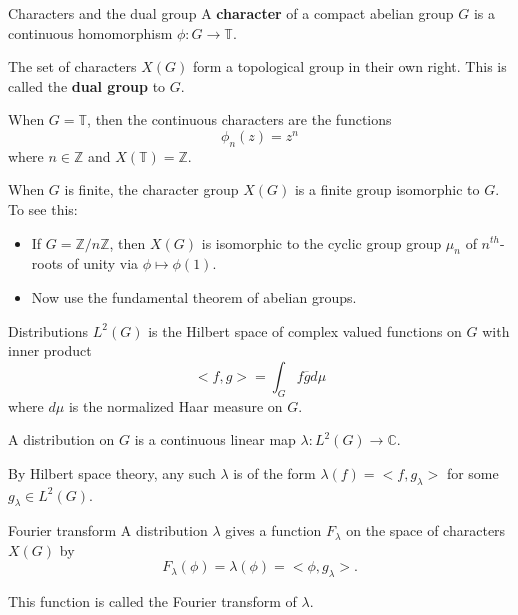 \documentclass[
  ignorenonframetext,
]{beamer}
\providecommand{\tightlist}{%
  \setlength{\itemsep}{0pt}\setlength{\parskip}{0pt}}
\begin{document}
\begin{frame}{Characters and the dual group}
\protect\hypertarget{characters-and-the-dual-group}{}
A \textbf{character} of a compact abelian group \(G\) is a continuous
homomorphism \(\phi:G\to \mathbb{T}\).

The set of characters \(X(G)\) form a topological group in their own
right. This is called the \textbf{dual group} to \(G\).

When \(G=\mathbb{T}\), then the continuous characters are the functions
\[
\phi_{n}(z)=z^{n}
\] where \(n\in\mathbb{Z}\) and \(X(\mathbb{T})=\mathbb{Z}\).

When \(G\) is finite, the character group \(X(G)\) is a finite group
isomorphic to \(G\). To see this:

\begin{itemize}
\tightlist
\item
  If \(G=\mathbb{Z}/n\mathbb{Z}\), then \(X(G)\) is isomorphic to the
  cyclic group group \(\mu_{n}\) of \(n^{th}\)-roots of unity via
  \(\phi\mapsto \phi(1)\).
\item
  Now use the fundamental theorem of abelian groups.
\end{itemize}
\end{frame}

\begin{frame}{Distributions}
\protect\hypertarget{distributions}{}
\(L^2(G)\) is the Hilbert space of complex valued functions on \(G\)
with inner product \[
<f,g>=\int_{G} f\overline{g}d\mu
\] where \(d\mu\) is the normalized Haar measure on \(G\).

A distribution on \(G\) is a continuous linear map
\(\lambda: L^2(G)\to\mathbb{C}\).

By Hilbert space theory, any such \(\lambda\) is of the form
\(\lambda(f)=<f,g_{\lambda}>\) for some \(g_{\lambda}\in L^{2}(G)\).
\end{frame}

\begin{frame}{Fourier transform}
\protect\hypertarget{fourier-transform}{}
A distribution \(\lambda\) gives a function \(F_{\lambda}\) on the space
of characters \(X(G)\) by \[
F_{\lambda}(\phi) = \lambda(\phi)=<\phi,g_{\lambda}>.
\]

This function is called the Fourier transform of \(\lambda\).
\end{frame}
\end{document}
